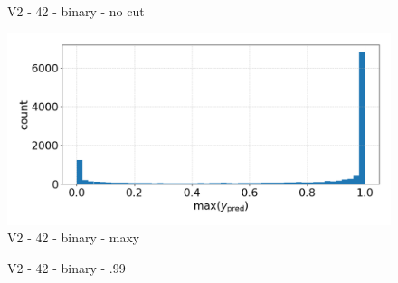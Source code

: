 \begin{figure}[h]
    \centering
    \qquad
    \caption{V2 - 42 - binary - no cut\label{fig:synth_spectra}}
\end{figure}
\begin{figure}
    \centering
    \includegraphics[width=.6\linewidth]{figures/v2/vit_model_V2max_ypred_binary_42.png}
    \caption{V2 - 42 - binary - maxy}
    \label{fig:42Binary}
\end{figure}
\begin{figure}[h]
    \centering
    \qquad
    \caption{V2 - 42 - binary - .99 \label{fig:synth_spectra}}
\end{figure}
